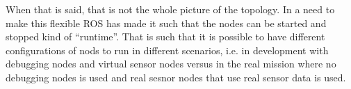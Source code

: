 
When that is said, that is not the whole picture of the topology. In a
need to make this flexible \ac{ROS} has made it such that the nodes
can be started and stopped kind of ``runtime''. That is such that it is
possible to have different configurations of nods to run in different
scenarios, i.e. in development with debugging nodes and virtual sensor
nodes versus in the real mission where no debugging nodes is used and
real sesnor nodes that use real sensor data is used.



